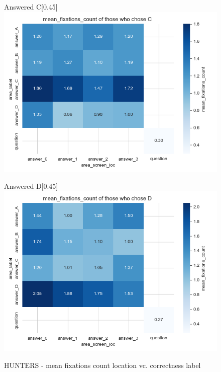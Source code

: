 \documentclass{article}
\begin{document}
\begin{figure}[H]
  \vspace{1em} %

  \begin{subcaptionbox}{Answered C\label{fig:C_fc_h}}[0.45\textwidth]
    {\centering\includegraphics[width=\linewidth]{plots/matrix_plots/matrix_mean_fixations_count_C_hunters.png}}
  \end{subcaptionbox}
  \hfill
  \begin{subcaptionbox}{Answered D\label{fig:D_fc_h}}[0.45\textwidth]
    {\centering\includegraphics[width=\linewidth]{plots/matrix_plots/matrix_mean_fixations_count_D_hunters.png}}
  \end{subcaptionbox}
  
  \caption{HUNTERS - mean fixations count location vc. correctness label}
  \label{fig:fourimages7}
\end{figure}
\end{document}
